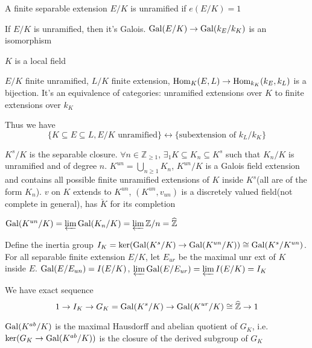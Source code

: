 \documentclass[main]{subfiles}
\begin{document}
\begin{definition}
A finite separable extension $E/K$ is unramified if $e(E/K)=1$
\end{definition}

\begin{fact}
If $E/K$ is unramified, then it's Galois. $\operatorname{Gal}(E/K)\to\operatorname{Gal}(k_E/k_K)$ is an isomorphism
\end{fact}

$K$ is a local field

\begin{fact}
$E/K$ finite unramified, $L/K$ finite extension, $\operatorname{Hom}_K(E,L)\to \operatorname{Hom}_{k_K}(k_E,k_L)$ is a bijection. It's an equivalence of categories: unramified extensions over $K$ to finite extensions over $k_K$
\end{fact}

Thus we have
\[\{K\subseteq E\subseteq L, E/K\text{ unramified}\} \leftrightarrow \{\text{subextension of } k_L/k_K\}\]

$K^s/K$ is the separable closure. $\forall n\in\mathbb Z_{\geq1}$, $\exists_1 K\subseteq K_n\subseteq K^s$ such that $K_n/K$ is unramified and of degree $n$. $K^{un}=\bigcup_{n\geq1}K_n$, $K^{un}/K$ is a Galois field extension and contains all possible finite unramified extensions of $K$ inside $K^s$(all are of the form $K_n$). $v$ on $K$ extends to $K^{un}$, $(K^{un},v_{un})$ is a discretely valued field(not complete in general), has $\breve K$ for its completion

$\operatorname{Gal}(K^{un}/K)=\varprojlim\operatorname{Gal}(K_n/K)=\varprojlim\mathbb Z/n=\widehat{\mathbb Z}$

Define the inertia group $I_K=\ker(\operatorname{Gal}(K^s/K)\to\operatorname{Gal}(K^{un}/K))\cong\operatorname{Gal}(K^s/K^{un})$. For all separable finite extension $E/K$, let $E_{ur}$ be the maximal unr ext of $K$ inside $E$. $\operatorname{Gal}(E/E_{un})=I(E/K)$, $\varprojlim\operatorname{Gal}(E/E_{ur})=\varprojlim I(E/K)=I_K$

We have exact sequence
\[1\to I_K\to G_K=\operatorname{Gal}(K^s/K)\to\operatorname{Gal}(K^{ur}/K)\cong\widehat{\mathbb Z}\to1\]

\begin{exercise}
$\operatorname{Gal}(K^{ab}/K)$ is the maximal Hausdorff and abelian quotient of $G_K$, i.e. $\ker(G_K\to\operatorname{Gal}(K^{ab}/K))$ is the closure of the derived subgroup of $G_K$
\end{exercise}
\end{document}
